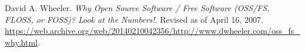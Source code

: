 \begin{thebibliography}{9} %


David A. Wheeler. \emph{Why Open Source Software / Free Software (OSS/FS,
FLOSS, or FOSS)? Look at the Numbers!}. Revised as of April 16, 2007.
\url{https://web.archive.org/web/20140210042356/http://www.dwheeler.com/oss_fs_why.html}.

\end{thebibliography}

